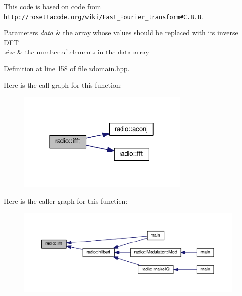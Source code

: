 This code is based on code from \href{http://rosettacode.org/wiki/Fast_Fourier_transform#C.2B.2B}{\tt http\+://rosettacode.\+org/wiki/\+Fast\+\_\+\+Fourier\+\_\+transform\#\+C.\+B.\+B}.


\begin{DoxyParams}{Parameters}
{\em data} & the array whose values should be replaced with its inverse D\+F\+T\\
\hline
{\em size} & the number of elements in the data array \\
\hline
\end{DoxyParams}


Definition at line 158 of file zdomain.\+hpp.



Here is the call graph for this function\+:
\nopagebreak
\begin{figure}[H]
\begin{center}
\leavevmode
\includegraphics[width=238pt]{namespaceradio_a51add4e2faf6d58cabc3b4a3892420eb_cgraph}
\end{center}
\end{figure}




Here is the caller graph for this function\+:
\nopagebreak
\begin{figure}[H]
\begin{center}
\leavevmode
\includegraphics[width=350pt]{namespaceradio_a51add4e2faf6d58cabc3b4a3892420eb_icgraph}
\end{center}
\end{figure}


